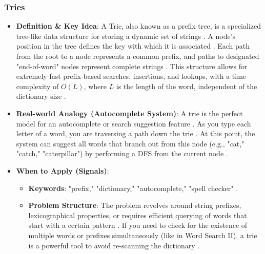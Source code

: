 \documentclass{article}
\begin{document}
\subsubsection{Tries}
\begin{itemize}
\item \textbf{Definition \& Key Idea}: A Trie, also known as a prefix tree, is a specialized tree-like data structure for storing a dynamic set of strings \cite{311, 312}. A node's position in the tree defines the key with which it is associated \cite{313}. Each path from the root to a node represents a common prefix, and paths to designated "end-of-word" nodes represent complete strings \cite{314, 315}. This structure allows for extremely fast prefix-based searches, insertions, and lookups, with a time complexity of $O(L)$, where $L$ is the length of the word, independent of the dictionary size \cite{316, 317}.
\item \textbf{Real-world Analogy (Autocomplete System)}: A trie is the perfect model for an autocomplete or search suggestion feature \cite{318, 319}. As you type each letter of a word, you are traversing a path down the trie \cite{319}. At this point, the system can suggest all words that branch out from this node (e.g., "cat," "catch," "caterpillar") by performing a DFS from the current node \cite{326}.
\item \textbf{When to Apply (Signals)}:
\begin{itemize}
\item \textbf{Keywords}: "prefix," "dictionary," "autocomplete," "spell checker" \cite{328}.
\item \textbf{Problem Structure}: The problem revolves around string prefixes, lexicographical properties, or requires efficient querying of words that start with a certain pattern \cite{329}. If you need to check for the existence of multiple words or prefixes simultaneously (like in Word Search II), a trie is a powerful tool to avoid re-scanning the dictionary \cite{330}.
\end{itemize}
\end{itemize}
\end{document}
